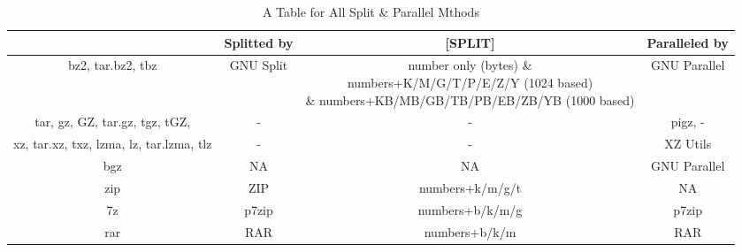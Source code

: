 \documentclass[journal,twocolumn]{IEEEtran}
\begin{document}
\begin{table}
\centering
\begin{tabular}{|c|c|c|c|}
\hline\hline
[EXT] & Splitted by & [SPLIT] & Paralleled by \\\hline\hline
bz2, tar.bz2, tbz & GNU Split &\parbox{7cm}{number only (bytes) \&\\ numbers+K/M/G/T/P/E/Z/Y (1024 based) \\ \& numbers+KB/MB/GB/TB/PB/EB/ZB/YB (1000 based)} & GNU Parallel \\\hline
tar, gz, GZ, tar.gz, tgz, tGZ,& - & - & pigz, - \\\hline
xz, tar.xz, txz, lzma, lz, tar.lzma, tlz & - & - & XZ Utils \\\hline
bgz & NA & NA & GNU Parallel\\\hline
zip & ZIP & numbers+k/m/g/t & NA \\\hline
7z & p7zip & numbers+b/k/m/g & p7zip \\\hline
rar & RAR & numbers+b/k/m & RAR \\\hline\hline
\end{tabular}
\caption{A Table for All Split \& Parallel Mthods}
\label{tbl:AllSplit}
\end{table}
\newpage
\twocolumn
\end{document}
